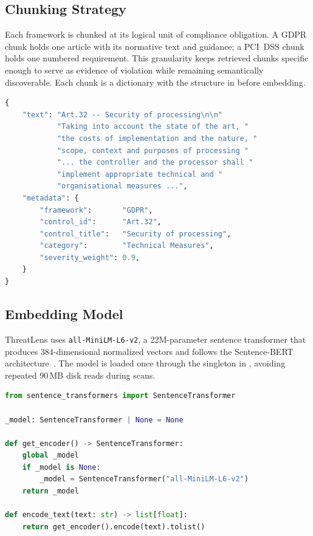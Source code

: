 \documentclass[conference]{IEEEtran}
\begin{document}
\subsection{Chunking Strategy}
Each framework is chunked at its logical unit of compliance obligation. A GDPR
chunk holds one article with its normative text and guidance; a PCI~DSS chunk
holds one numbered requirement. This granularity keeps retrieved chunks specific
enough to serve as evidence of violation while remaining semantically
discoverable. Each chunk is a dictionary with the structure in 
before embedding.

\begin{lstlisting}[language=Python, label={lst:chunk},
  caption={Chunk data structure for the compliance knowledge base.}]
{
    "text": "Art.32 -- Security of processing\n\n"
            "Taking into account the state of the art, "
            "the costs of implementation and the nature, "
            "scope, context and purposes of processing "
            "... the controller and the processor shall "
            "implement appropriate technical and "
            "organisational measures ...",
    "metadata": {
        "framework":       "GDPR",
        "control_id":      "Art.32",
        "control_title":   "Security of processing",
        "category":        "Technical Measures",
        "severity_weight": 0.9,
    }
}
\end{lstlisting}

\subsection{Embedding Model}
ThreatLens uses \texttt{all-MiniLM-L6-v2}, a 22M-parameter sentence transformer
that produces 384-dimensional normalized vectors and follows the Sentence-BERT
architecture~\cite{reimers2019}. The model is loaded once through the singleton
in , avoiding repeated 90\,MB disk reads during scans.

\begin{lstlisting}[language=Python, label={lst:embedder},
  caption={Singleton embedder to avoid repeated model loading.}]
from sentence_transformers import SentenceTransformer

_model: SentenceTransformer | None = None

def get_encoder() -> SentenceTransformer:
    global _model
    if _model is None:
        _model = SentenceTransformer("all-MiniLM-L6-v2")
    return _model

def encode_text(text: str) -> list[float]:
    return get_encoder().encode(text).tolist()
\end{lstlisting}
\end{document}
